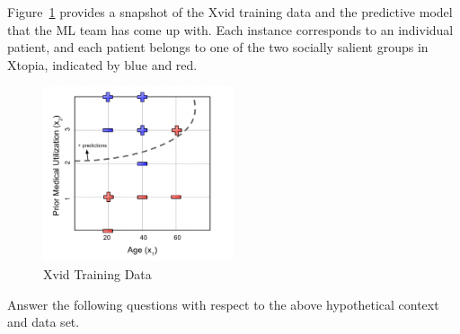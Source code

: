 \documentclass[11pt,addpoints,answers]{exam}
\begin{document}
\begin{questions}
Figure~\ref{fig:dataset} provides a snapshot of the Xvid training data and the predictive model that the ML team has come up with. Each instance corresponds to an individual patient, and each patient belongs to one of the two socially salient groups in Xtopia, indicated by blue and red.

\begin{figure}[h!]
    \centering
    \includegraphics[width=0.5\textwidth]{figs/cartoon_dataset.png}
    \caption{Xvid Training Data}
   \label{fig:dataset}
\end{figure}

Answer the following questions with respect to the above hypothetical context and data set.

\newpage
{}
\end{questions}
\end{document}
